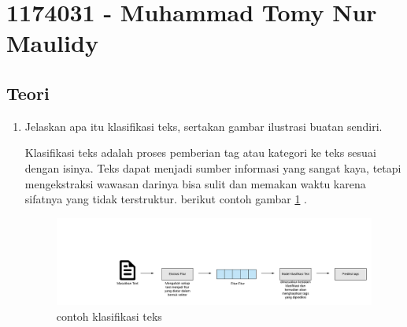 \section{1174031 - Muhammad Tomy Nur Maulidy}

\subsection{Teori}
\begin{enumerate}
\item Jelaskan apa itu klasifikasi teks, sertakan gambar ilustrasi buatan sendiri.
\par Klasiﬁkasi teks adalah proses pemberian tag atau kategori ke teks sesuai dengan isinya. Teks dapat menjadi sumber informasi yang sangat kaya, tetapi mengekstraksi wawasan darinya bisa sulit dan memakan waktu karena sifatnya yang tidak terstruktur. berikut contoh gambar \ref{klasifikasi teks} .
\begin{figure}[H]
\centering
\includegraphics[scale=0.2]{figures/1174031/4/1.png}
\caption{contoh klasifikasi teks}
\label{klasifikasi teks}
\end{figure}


\end{enumerate}
